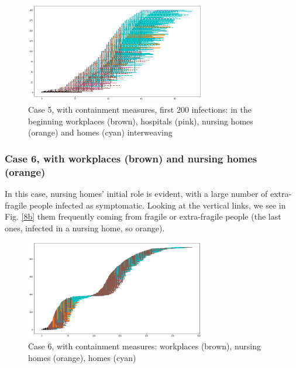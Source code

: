 \documentclass[11pt]{article}
\begin{document}
\begin{figure}[H]
\begin{center}
\includegraphics[width=0.7\textwidth]{with7b.png}%
\caption{Case 5, with containment measures, first 200 infections: in the beginning workplaces (brown), hospitals (pink), nursing homes (orange) and homes (cyan) interweaving}
\label{7b}
\end{center}
\end{figure}

\subsubsection{Case 6, with workplaces (brown) and nursing homes (orange)}
\label{c6}


In this case, nursing homes' initial role is evident, with a large number of extra-fragile people infected as symptomatic. Looking at the vertical links, we see in Fig. \ref{8b} them frequently coming from fragile or extra-fragile people (the last ones, infected in a nursing home, so orange).

\begin{figure}[H]
\begin{center}
\includegraphics[width=0.7\textwidth]{with8a.png}%
\caption{Case 6, with containment measures: workplaces (brown), nursing homes (orange), homes (cyan)}
\label{8a}
\end{center}
\end{figure}
\end{document}
